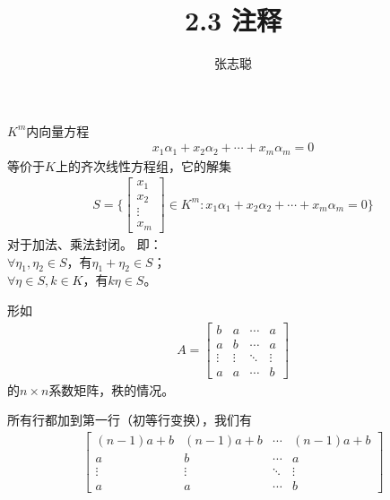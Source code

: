 \documentclass{article}
\begin{document}
\title{2.3 注释}
\author{张志聪}
\maketitle

\begin{zremark}
  $K^m$内向量方程
  \begin{align*}
    x_1 \alpha_1 + x_2 \alpha_2 + \cdots + x_m \alpha_m = 0
  \end{align*}
  等价于$K$上的齐次线性方程组，它的解集
  \begin{align*}
    S = \{
    \begin{bmatrix}
      x_1    \\
      x_2    \\
      \vdots \\
      x_m
    \end{bmatrix}
    \in K^m : x_1 \alpha_1 + x_2 \alpha_2 + \cdots + x_m \alpha_m = 0\}
  \end{align*}
  对于加法、乘法封闭。
  即：\\
  $\forall \eta_1, \eta_2 \in S$，有$\eta_1 + \eta_2 \in S$；\\
  $\forall \eta \in S, k \in K$，有$k \eta \in S$。
\end{zremark}

\begin{zremark}
  形如
  \begin{align*}
    A = \begin{bmatrix}
          b      & a      & \cdots & a      \\
          a      & b      & \cdots & a      \\
          \vdots & \vdots & \ddots & \vdots \\
          a      & a      & \cdots & b
        \end{bmatrix}
  \end{align*}
  的$n \times n$系数矩阵，秩的情况。
\end{zremark}

所有行都加到第一行（初等行变换），我们有
\begin{align*}
  \begin{bmatrix}
    (n - 1)a + b & (n - 1)a + b & \cdots & (n - 1)a + b \\
    a            & b            & \cdots & a            \\
    \vdots       & \vdots       & \ddots & \vdots       \\
    a            & a            & \cdots & b
  \end{bmatrix}
\end{align*}
\end{document}
